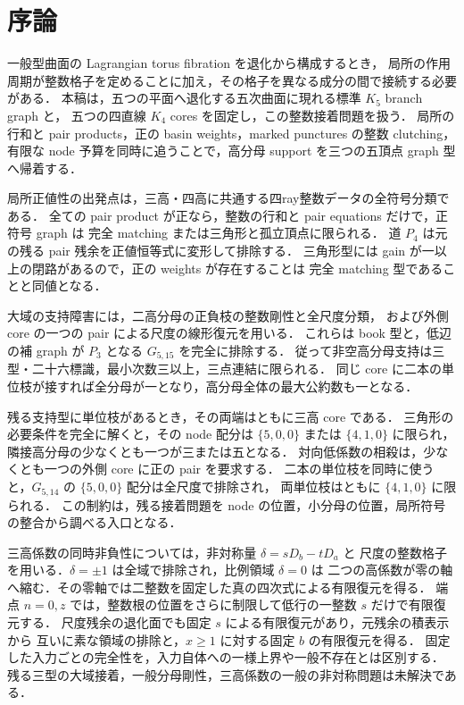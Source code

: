 \section{序論}
\label{ar17:introduction}

一般型曲面の Lagrangian torus fibration を退化から構成するとき，
局所の作用周期が整数格子を定めることに加え，その格子を異なる成分の間で接続する必要がある．
本稿は，五つの平面へ退化する五次曲面に現れる標準 $K_5$ branch graph と，
五つの四直線 $K_4$ cores を固定し，この整数接着問題を扱う．
局所の行和と pair products，正の basin weights，marked punctures の整数 clutching，
有限な node 予算を同時に追うことで，高分母 support を三つの五頂点 graph 型へ帰着する．

局所正値性の出発点は，三高・四高に共通する四ray整数データの全符号分類である．
全ての pair product が正なら，整数の行和と pair equations だけで，正符号 graph は
完全 matching または三角形と孤立頂点に限られる．
道 $P_4$ は元の残る pair 残余を正値恒等式に変形して排除する．
三角形型には gain が一以上の閉路があるので，正の weights が存在することは
完全 matching 型であることと同値となる．

大域の支持障害には，二高分母の正負枝の整数剛性と全尺度分類，
および外側 core の一つの pair による尺度の線形復元を用いる．
これらは book 型と，低辺の補 graph が $P_3$ となる $G_{5,15}$ を完全に排除する．
従って非空高分母支持は三型・二十六標識，最小次数三以上，三点連結に限られる．
同じ core に二本の単位枝が接すれば全分母が一となり，高分母全体の最大公約数も一となる．

残る支持型に単位枝があるとき，その両端はともに三高 core である．
三角形の必要条件を完全に解くと，その node 配分は
$\{5,0,0\}$ または $\{4,1,0\}$ に限られ，隣接高分母の少なくとも一つが三または五となる．
対向低係数の相殺は，少なくとも一つの外側 core に正の pair を要求する．
二本の単位枝を同時に使うと，$G_{5,14}$ の $\{5,0,0\}$ 配分は全尺度で排除され，
両単位枝はともに $\{4,1,0\}$ に限られる．
この制約は，残る接着問題を node の位置，小分母の位置，局所符号の整合から調べる入口となる．

三高係数の同時非負性については，非対称量 $\delta=sD_b-tD_a$ と
尺度の整数格子を用いる．$\delta=\pm1$ は全域で排除され，比例領域 $\delta=0$ は
二つの高係数が零の軸へ縮む．その零軸では二整数を固定した真の四次式による有限復元を得る．
端点 $n=0,z$ では，整数根の位置をさらに制限して低行の一整数 $s$ だけで有限復元する．
尺度残余の退化面でも固定 $s$ による有限復元があり，元残余の積表示から
互いに素な領域の排除と，$x\ge1$ に対する固定 $b$ の有限復元を得る．
固定した入力ごとの完全性を，入力自体への一様上界や一般不存在とは区別する．
残る三型の大域接着，一般分母剛性，三高係数の一般の非対称問題は未解決である．

